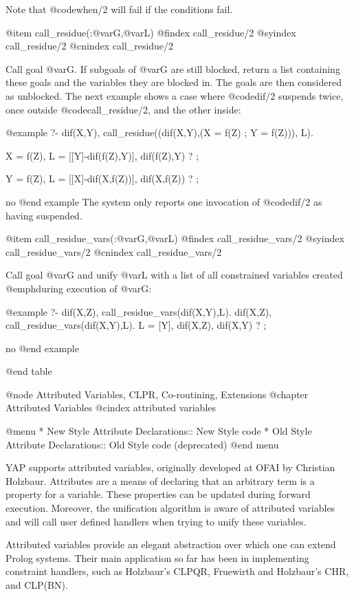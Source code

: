 {{{{{{{{{Note that @code{when/2} will fail if the conditions fail.

@item call_residue(:@var{G},@var{L})
@findex call_residue/2
@syindex call_residue/2
@cnindex call_residue/2

Call goal @var{G}. If subgoals of @var{G} are still blocked, return
a list containing these goals and the variables they are blocked in. The
goals are then considered as unblocked. The next example shows a case
where @code{dif/2} suspends twice, once outside @code{call_residue/2},
and the other inside:

@example
?- dif(X,Y),
       call_residue((dif(X,Y),(X = f(Z) ; Y = f(Z))), L).

X = f(Z),
L = [[Y]-dif(f(Z),Y)],
dif(f(Z),Y) ? ;

Y = f(Z),
L = [[X]-dif(X,f(Z))],
dif(X,f(Z)) ? ;

no
@end example
The system only reports one invocation of @code{dif/2} as having
suspended. 

@item call_residue_vars(:@var{G},@var{L})
@findex call_residue_vars/2
@syindex call_residue_vars/2
@cnindex call_residue_vars/2

Call goal @var{G} and unify @var{L} with a list of all constrained variables created @emph{during} execution of @var{G}:

@example
  ?- dif(X,Z), call_residue_vars(dif(X,Y),L).
dif(X,Z), call_residue_vars(dif(X,Y),L).
L = [Y],
dif(X,Z),
dif(X,Y) ? ;

no
@end example

@end table

@node Attributed Variables, CLPR, Co-routining, Extensions
@chapter Attributed Variables
@cindex attributed variables

@menu
* New Style Attribute Declarations:: New Style code
* Old Style Attribute Declarations:: Old Style code (deprecated)
@end menu

YAP supports attributed variables, originally developed at OFAI by
Christian Holzbaur. Attributes are a means of declaring that an
arbitrary term is a property for a variable. These properties can be
updated during forward execution. Moreover, the unification algorithm is
aware of attributed variables and will call user defined handlers when
trying to unify these variables.

Attributed variables provide an elegant abstraction over which one can
extend Prolog systems. Their main application so far has been in
implementing constraint handlers, such as Holzbaur's CLPQR, Fruewirth
and Holzbaur's CHR, and CLP(BN). 

}}}}}}}}}
